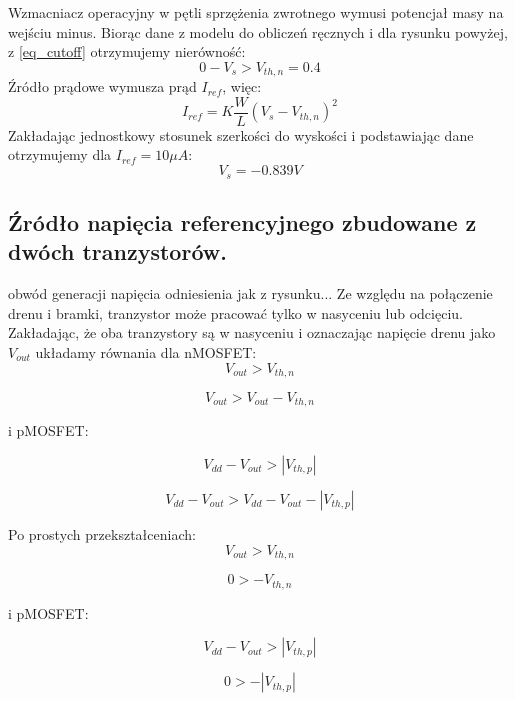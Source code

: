 \documentclass[10pt,a4paper]{report}
\theoremstyle{definition}
\theoremstyle{definition}
\theoremstyle{definition}
\theoremstyle{definition}
\theoremstyle{definition}
\begin{document}
{	
	
	
	{ Wzmacniacz operacyjny w pętli sprzężenia zwrotnego wymusi potencjał masy na wejściu minus. Biorąc dane z modelu do obliczeń ręcznych i dla rysunku powyżej, z \ref{eq_cutoff} otrzymujemy nierówność:
		$$
		0 - V_s > V_{th,n} = 0.4
		$$
		Źródło prądowe wymusza prąd $I_{ref}$, więc:
		$$
		I_{ref} = K \frac{W}{L}\left( V_s-V_{th,n}\right)^2
		$$
		Zakładając jednostkowy stosunek szerkości do wyskości i podstawiając dane otrzymujemy dla $I_{ref} = 10\mu A$:
		$$
		V_s = -0.839V
		$$
	}

	\subsection{Źródło napięcia referencyjnego zbudowane z dwóch tranzystorów.}
obwód generacji napięcia odniesienia jak z rysunku...
Ze względu na połączenie drenu i bramki, tranzystor może pracować tylko w nasyceniu lub odcięciu. Zakładając, że oba tranzystory
są w nasyceniu i oznaczając napięcie drenu jako $V_{out}$ układamy równania dla nMOSFET:
\begin{equation}
V_{out} > V_{th,n}
\end{equation}

\begin{equation}
V_{out} > V_{out} - V_{th,n}
\end{equation}

i pMOSFET:

\begin{equation}
V_{dd} - V_{out} > \left|V_{th,p}\right|
\end{equation}

\begin{equation}
V_{dd} - V_{out} > V_{dd} - V_{out} - \left|V_{th,p}\right|
\end{equation}

Po prostych przekształceniach:
\begin{equation}
V_{out} > V_{th,n}
\end{equation}

\begin{equation}
0 > - V_{th,n}
\end{equation}

i pMOSFET:

\begin{equation}
V_{dd} - V_{out} > \left|V_{th,p}\right|
\end{equation}

\begin{equation}
0 > - \left|V_{th,p}\right|
\end{equation}


}
\end{document}
